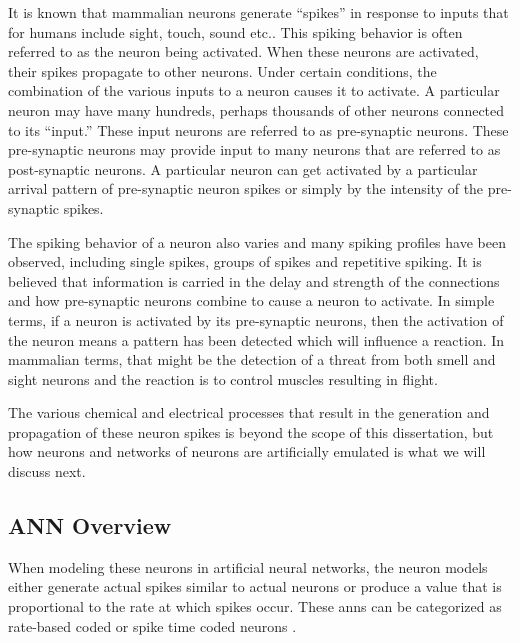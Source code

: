 \iftrue
It is known that mammalian neurons generate ``spikes'' in response to inputs that for humans include sight, touch, sound etc.. This spiking behavior is often referred to as the neuron being activated.
When these neurons are activated, their spikes propagate to other neurons. Under certain conditions, the combination of the various inputs to a neuron causes it to activate. 
A particular neuron may have many hundreds, perhaps thousands of other neurons connected to its ``input.''
These input neurons are referred to as pre-synaptic neurons. These pre-synaptic neurons may provide input to many neurons that are referred to as post-synaptic neurons.
A particular neuron can get activated by a particular arrival pattern of pre-synaptic neuron spikes or simply by the intensity of the pre-synaptic spikes. 

The spiking behavior of a neuron also varies and many spiking profiles have been observed, including single spikes, groups of spikes and repetitive spiking. 
It is believed that information is carried in the delay and strength of the connections and how pre-synaptic neurons combine to cause a neuron to activate.
In simple terms, if a neuron is activated by its pre-synaptic neurons, then the activation of the neuron means a pattern has been detected which will influence a reaction.
In mammalian terms, that might be the detection of a threat from both smell and sight neurons and the reaction is to control muscles resulting in flight.


The various chemical and electrical processes that result in the generation and propagation of these neuron spikes is beyond the scope of this dissertation, but how neurons and networks of neurons are artificially emulated is what we will discuss next.


\subsection[ANN Overview]{ANN Overview}
\label{sec:ANN Overview}

When modeling these neurons in artificial neural networks, the neuron models either generate actual spikes similar to actual neurons or
produce a value that is proportional to the rate at which spikes occur.
These \acp{ann} can be categorized as rate-based coded or spike time coded neurons \cite{10.3389/fnsys.2015.00151}\cite{NNintro_Bullinaria}.


